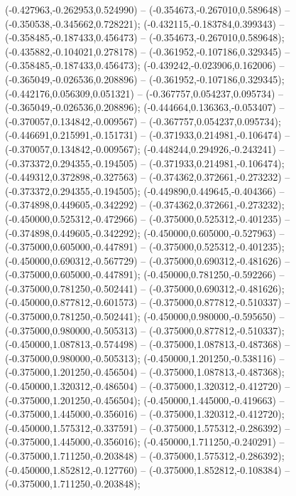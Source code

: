 (-0.427963,-0.262953,0.524990) -- (-0.354673,-0.267010,0.589648) -- (-0.350538,-0.345662,0.728221);
 (-0.432115,-0.183784,0.399343) -- (-0.358485,-0.187433,0.456473) -- (-0.354673,-0.267010,0.589648);
 (-0.435882,-0.104021,0.278178) -- (-0.361952,-0.107186,0.329345) -- (-0.358485,-0.187433,0.456473);
 (-0.439242,-0.023906,0.162006) -- (-0.365049,-0.026536,0.208896) -- (-0.361952,-0.107186,0.329345);
 (-0.442176,0.056309,0.051321) -- (-0.367757,0.054237,0.095734) -- (-0.365049,-0.026536,0.208896);
 (-0.444664,0.136363,-0.053407) -- (-0.370057,0.134842,-0.009567) -- (-0.367757,0.054237,0.095734);
 (-0.446691,0.215991,-0.151731) -- (-0.371933,0.214981,-0.106474) -- (-0.370057,0.134842,-0.009567);
 (-0.448244,0.294926,-0.243241) -- (-0.373372,0.294355,-0.194505) -- (-0.371933,0.214981,-0.106474);
 (-0.449312,0.372898,-0.327563) -- (-0.374362,0.372661,-0.273232) -- (-0.373372,0.294355,-0.194505);
 (-0.449890,0.449645,-0.404366) -- (-0.374898,0.449605,-0.342292) -- (-0.374362,0.372661,-0.273232);
 (-0.450000,0.525312,-0.472966) -- (-0.375000,0.525312,-0.401235) -- (-0.374898,0.449605,-0.342292);
 (-0.450000,0.605000,-0.527963) -- (-0.375000,0.605000,-0.447891) -- (-0.375000,0.525312,-0.401235);
 (-0.450000,0.690312,-0.567729) -- (-0.375000,0.690312,-0.481626) -- (-0.375000,0.605000,-0.447891);
 (-0.450000,0.781250,-0.592266) -- (-0.375000,0.781250,-0.502441) -- (-0.375000,0.690312,-0.481626);
 (-0.450000,0.877812,-0.601573) -- (-0.375000,0.877812,-0.510337) -- (-0.375000,0.781250,-0.502441);
 (-0.450000,0.980000,-0.595650) -- (-0.375000,0.980000,-0.505313) -- (-0.375000,0.877812,-0.510337);
 (-0.450000,1.087813,-0.574498) -- (-0.375000,1.087813,-0.487368) -- (-0.375000,0.980000,-0.505313);
 (-0.450000,1.201250,-0.538116) -- (-0.375000,1.201250,-0.456504) -- (-0.375000,1.087813,-0.487368);
 (-0.450000,1.320312,-0.486504) -- (-0.375000,1.320312,-0.412720) -- (-0.375000,1.201250,-0.456504);
 (-0.450000,1.445000,-0.419663) -- (-0.375000,1.445000,-0.356016) -- (-0.375000,1.320312,-0.412720);
 (-0.450000,1.575312,-0.337591) -- (-0.375000,1.575312,-0.286392) -- (-0.375000,1.445000,-0.356016);
 (-0.450000,1.711250,-0.240291) -- (-0.375000,1.711250,-0.203848) -- (-0.375000,1.575312,-0.286392);
 (-0.450000,1.852812,-0.127760) -- (-0.375000,1.852812,-0.108384) -- (-0.375000,1.711250,-0.203848);
